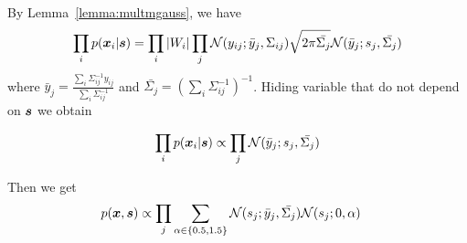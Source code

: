 By Lemma~\ref{lemma:multmgauss}, we have
\begin{align}
  \prod_i p(\boldsymbol{x}_i | \boldsymbol{s}) &= \prod_i |W_i| \prod_j \mathcal{N}(y_{ij}; \bar{y}_{j}, \Sigma_{ij}) \sqrt{2 \pi \bar{\Sigma_{j}}} \mathcal{N}(\bar{y}_j; s_j, \bar{\Sigma_{j}})  \\
\end{align}
where $\bar{y}_j = \frac{\sum_i \Sigma_{ij}^{-1} y_{ij}}{ \sum_i
  \Sigma_{ij}^{-1}}$ and $\bar{\Sigma_{j}} = (\sum_i
\Sigma_{ij}^{-1})^{-1}$.
Hiding variable that do not depend on $\boldsymbol{s}$ we obtain

\begin{align}
  \prod_i p(\boldsymbol{x}_i | \boldsymbol{s}) &\propto \prod_j \mathcal{N}(\bar{y}_j; s_j, \bar{\Sigma_{j}})  \\
\end{align}

Then we get
\begin{align}
  p(\boldsymbol{x}, \boldsymbol{s}) &\propto \prod_j \sum_{\alpha \in \{0.5, 1.5\}} \mathcal{N}(s_j; \bar{y}_j, \bar{\Sigma_{j}}) \mathcal{N}(s_j; 0, \alpha)
\end{align}

